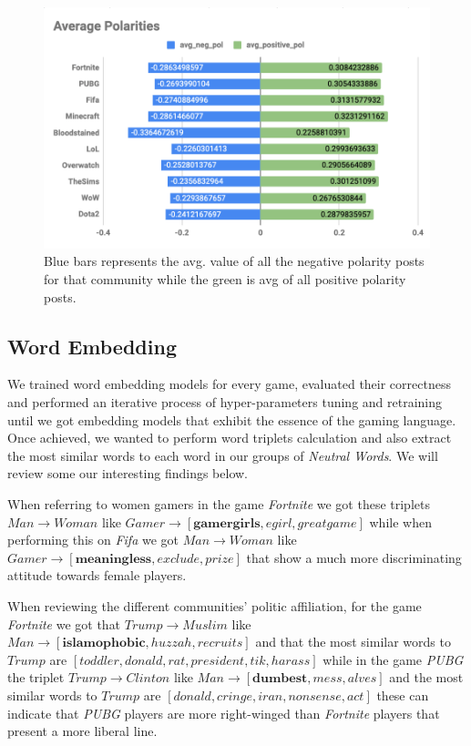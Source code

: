 \begin{figure}[h]
    \begin{center}
        \includegraphics[scale=0.43]{Images/avg_polarities.png}
    \end{center}
    \caption{Blue bars represents the avg. value of all the negative polarity posts for that community while the green is avg of all positive polarity posts.}
    \label{fig:PolarityAverage}
\end{figure}


\subsection{Word Embedding}
We trained word embedding models for every game, evaluated their correctness and performed an iterative process of hyper-parameters tuning and retraining until we got embedding models that exhibit the essence of the gaming language.
Once achieved, we wanted to perform word triplets calculation and also extract the most similar words to each word in our groups of \emph{Neutral Words}. We will review some our interesting findings below.
\vspace{2mm}

When referring to women gamers in the game \emph{Fortnite} we got these triplets $Man\rightarrow Woman$ like $Gamer \rightarrow [\textbf{gamergirls}, egirl, greatgame]$ while when performing this on \emph{Fifa} we got $Man\rightarrow Woman$ like $Gamer \rightarrow [\textbf{meaningless}, exclude, prize]$ that show a much more discriminating attitude towards female players. 
\vspace{2mm}

When reviewing the different communities' politic affiliation, for the game \emph{Fortnite} we got that $Trump \rightarrow Muslim$ like $Man \rightarrow [\textbf{islamophobic}, huzzah, recruits]$ and that the most similar words to $Trump$ are $[toddler, donald, rat, president, tik, harass]$ while in the game \emph{PUBG} the triplet $Trump \rightarrow Clinton$ like $Man \rightarrow [\textbf{dumbest}, mess, alves]$ and the most similar words to $Trump$ are $[donald, cringe, iran, nonsense, act]$ these can indicate that \emph{PUBG} players are more right-winged than \emph{Fortnite} players that present a more liberal line.
\vspace{2mm}

